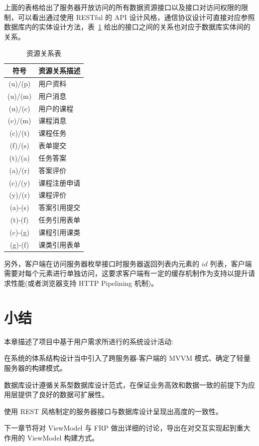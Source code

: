 
上面的表格给出了服务器开放访问的所有数据资源接口以及接口对访问权限的限制，可以看出通过使用 RESTful 的 API 设计风格，通信协议设计可直接对应参照数据库内的实体设计方法，表~\ref{APURIRelation} 给出的接口之间的关系也对应于数据库实体间的关系。

\begin{table}[!h]
  \begin{center}
    \noindent
    \ttfamily
    \begin{tabular}{|c|l|}
      \hline
      \textbf{符号} & \textbf{资源关系描述} \\ \hline
      (u)/(p) & 用户资料     \\ \hline
      (u)/(m) & 用户消息     \\ \hline
      (u)/(c) & 用户的课程   \\ \hline
      (c)/(m) & 课程消息     \\ \hline
      (c)/(t) & 课程任务     \\ \hline
      (f)/(s) & 表单提交     \\ \hline
      (t)/(a) & 任务答案     \\ \hline
      (a)/(r) & 答案评价     \\ \hline
      (c)/(y) & 课程注册申请 \\ \hline
      (y)/(r) & 课程评价     \\ \hline
      (a)-(s) & 答案引用提交 \\ \hline
      (t)-(f) & 任务引用表单 \\ \hline
      (c)-(g) & 课程引用课类 \\ \hline
      (g)-(f) & 课类引用表单 \\ \hline
    \end{tabular}
    \caption{资源关系表\label{APURIRelation}}
  \end{center}
\end{table}

另外，客户端在访问服务器枚举接口时服务器返回列表内元素的 $id$ 列表，客户端需要对每个元素进行单独访问，这要求客户端有一定的缓存机制作为支持以提升请求性能(或者浏览器支持 HTTP Pipelining 机制)。

\newpage

\section{小结}

本章描述了项目中基于用户需求所进行的系统设计活动:

在系统的体系结构设计当中引入了跨服务器-客户端的 MVVM 模式、确定了轻量服务器的构建模式。

数据库设计遵循关系型数据库设计范式，在保证业务高效和数据一致的前提下为应用层提供了良好的数据可扩展性。

使用 REST 风格制定的服务器接口与数据库设计呈现出高度的一致性。

下一章节将对 ViewModel 与 FRP 做出详细的讨论，导出在对交互实现起到重大作用的 ViewModel 构建方式。

